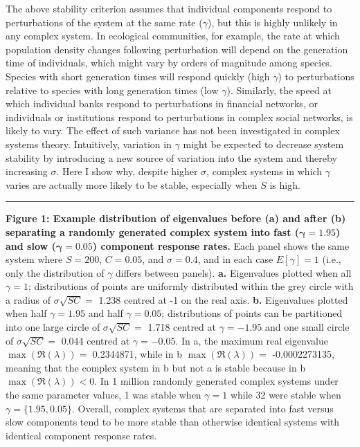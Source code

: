 \documentclass[]{article}
\begin{document}
The above stability criterion assumes that individual components respond
to perturbations of the system at the same rate (\(\gamma\)), but this
is highly unlikely in any complex system. In ecological communities, for
example, the rate at which population density changes following
perturbation will depend on the generation time of individuals, which
might vary by orders of magnitude among species. Species with short
generation times will respond quickly (high \(\gamma\)) to perturbations
relative to species with long generation times (low \(\gamma\)).
Similarly, the speed at which individual banks respond to perturbations
in financial networks, or individuals or institutions respond to
perturbations in complex social networks, is likely to vary. The effect
of such variance has not been investigated in complex systems theory.
Intuitively, variation in \(\gamma\) might be expected to decrease
system stability by introducing a new source of variation into the
system and thereby increasing \(\sigma\). Here I show why, despite
higher \(\sigma\), complex systems in which \(\gamma\) varies are
actually more likely to be stable, especially when \(S\) is high.

\begin{center}\rule{0.5\linewidth}{\linethickness}\end{center}

\textbf{Figure 1: Example distribution of eigenvalues before (a) and
after (b) separating a randomly generated complex system into fast
(\(\boldsymbol{\gamma} = 1.95\)) and slow
(\(\boldsymbol{\gamma} = 0.05\)) component response rates.} Each panel
shows the same system where \(S = 200\), \(C = 0.05\), and
\(\sigma = 0.4\), and in each case \(E[\gamma] = 1\) (i.e., only the
distribution of \(\gamma\) differs between panels). \textbf{a.}
Eigenvalues plotted when all \(\gamma = 1\); distributions of points are
uniformly distributed within the grey circle with a radius of
\(\sigma\sqrt{SC} =\) 1.238 centred at -1 on the real axis. \textbf{b.}
Eigenvalues plotted when half \(\gamma = 1.95\) and half
\(\gamma = 0.05\); distributions of points can be partitioned into one
large circle of \(\sigma\sqrt{SC} =\) 1.718 centred at
\(\gamma = -1.95\) and one small circle of \(\sigma\sqrt{SC} =\) 0.044
centred at \(\gamma = -0.05\). In a, the maximum real eigenvalue
\(\max\left(\Re(\lambda)\right) =\) 0.2344871, while in b
\(\max\left(\Re(\lambda)\right) =\) -0.0002273135, meaning that the
complex system in b but not a is stable because in b
\(\max\left(\Re(\lambda)\right) < 0\). In 1 million randomly generated
complex systems under the same parameter values, 1 was stable when
\(\gamma = 1\) while 32 were stable when \(\gamma = \{1.95, 0.05\}\).
Overall, complex systems that are separated into fast versus slow
components tend to be more stable than otherwise identical systems with
identical component response rates.
\end{document}
